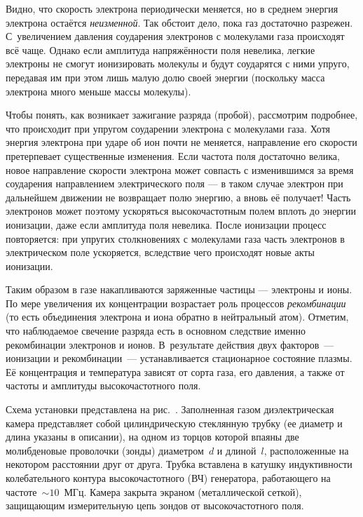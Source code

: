 Видно, что скорость электрона периодически меняется, 
но в среднем энергия электрона остаётся \emph{неизменной}. 
Так обстоит дело, пока газ достаточно разрежен. С~увеличением
давления соударения электронов с молекулами газа происходят всё чаще.
Однако если амплитуда напряжённости поля невелика,
легкие электроны не смогут ионизировать молекулы 
и будут соударятся с ними упруго, передавая им при этом
лишь малую долю своей энергии (поскольку масса электрона
много меньше массы молекулы).

Чтобы понять, как возникает зажигание разряда (пробой), рассмотрим
подробнее, что происходит при упругом соударении электрона с молекулами газа. 
Хотя энергия электрона при ударе об ион почти не меняется, 
направление его скорости претерпевает существенные изменения.
Если частота поля достаточно велика, новое направление
скорости электрона может совпасть с изменившимся за время соударения направлением 
электрического поля --- в таком случае электрон при
дальнейшем движении не возвращает полю энергию, а вновь её получает! 
Часть
электронов может поэтому ускоряться высокочастотным полем вплоть
до энергии ионизации, даже если амплитуда поля невелика. 
После ионизации процесс повторяется: при упругих столкновениях с молекулами газа 
часть электронов в электрическом поле ускоряется, вследствие чего 
происходят новые акты ионизации. 

Таким образом в газе накапливаются заряженные частицы --- электроны и ионы. По мере
увеличения их концентрации возрастает роль процессов \emph{рекомбинации}
(то есть объединения электрона и иона обратно в нейтральный атом). 
Отметим, что наблюдаемое свечение разряда есть в основном следствие именно рекомбинации
электронов и ионов.
В~результате
действия двух факторов~--- ионизации и рекомбинации~---
устанавливается стационарное состояние плазмы.
Её концентрация и температура зависят от сорта газа, его давления,
а также от частоты и амплитуды высокочастотного поля.


\experiment

Схема установки представлена на рис.~.
Заполненная газом диэлектрическая камера представляет собой цилиндрическую
стеклянную трубку (ее диаметр и длина указаны в описании), на одном из торцов
которой впаяны две молибденовые проволочки (зонды)
диаметром~$d$ и длиной~$l$, расположенные на некотором расстоянии друг от друга.
Трубка вставлена в катушку индуктивности колебательного контура высокочастотного 
(ВЧ) генератора, 
работающего на частоте~$\sim10$~МГц. 
Камера закрыта экраном (металлической сеткой), защищающим измерительную
цепь зондов от высокочастотного поля.

